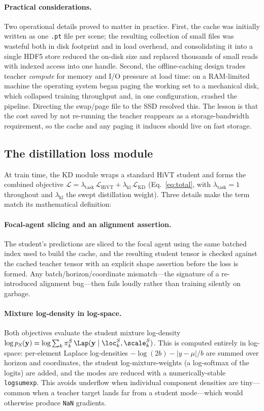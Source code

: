 \paragraph{Practical considerations.}
Two operational details proved to matter in practice. First, the cache was
initially written as one \texttt{.pt} file per scene; the resulting collection
of small files was wasteful both in disk footprint and in load overhead, and
consolidating it into a single HDF5 store reduced the on-disk size and replaced
thousands of small reads with indexed access into one handle. Second, the
offline-caching design trades teacher \emph{compute} for memory and I/O
pressure at load time: on a RAM-limited machine the operating system began
paging the working set to a mechanical disk, which collapsed training
throughput and, in one configuration, crashed the pipeline. Directing the
swap/page file to the SSD resolved this. The lesson is that the cost saved by
not re-running the teacher reappears as a storage-bandwidth requirement, so the
cache and any paging it induces should live on fast storage.

\subsection{The distillation loss module}
\label{ssec:impl_loss}
At train time, the KD module wraps a standard HiVT student and forms the combined
objective $\mathcal{L}=\lambda_{\text{task}}\,\mathcal{L}_{\mathrm{HiVT}} +
\lambda_{\text{kl}}\,\mathcal{L}_{\mathrm{KD}}$ (Eq.~\ref{eq:total}, with
$\lambda_{\text{task}}{=}1$ throughout and $\lambda_{\text{kl}}$ the swept
distillation weight). Three details make the term match its mathematical
definition:

\paragraph{Focal-agent slicing and an alignment assertion.}
The student's predictions are sliced to the focal agent using the same batched
index used to build the cache, and the resulting student tensor is checked against
the cached teacher tensor with an explicit shape assertion before the loss is
formed. Any batch/horizon/coordinate mismatch---the signature of a re-introduced
alignment bug---then fails loudly rather than training silently on garbage.

\paragraph{Mixture log-density in log-space.}
Both objectives evaluate the student mixture log-density
$\log p_S(\mathbf{y})=\log\sum_k \pi^S_k\,\Lap(\mathbf{y}\mid\loc^S_k,\scale^S_k)$.
This is computed entirely in log-space: per-element Laplace log-densities
$-\log(2b)-|y-\mu|/b$ are summed over horizon and coordinates, the student
log-mixture-weights (a log-softmax of the logits) are added, and the modes are
reduced with a numerically-stable \texttt{logsumexp}. This avoids underflow when
individual component densities are tiny---common when a teacher target lands far
from a student mode---which would otherwise produce \texttt{NaN} gradients.

